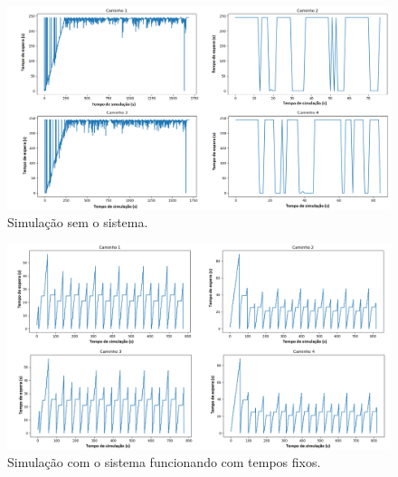 \begin{figure}[H]
    \begin{center}
    \includegraphics[width=1.0\textwidth]{figuras/Queue_Duration_No_TrafficLight.PNG}
    \end{center}
    \caption[Duração das filas, cenário 1]{Simulação sem o sistema.}
    \label{queueNoTL}
\end{figure}

\begin{figure}[H]
    \begin{center}
    \includegraphics[width=1.0\textwidth]{figuras/Queue_Duration_With_TrafficLight.PNG}
    \end{center}
    \caption[Duração das filas, cenário 2]{Simulação com o sistema funcionando com tempos fixos.}
    \label{queueWithTL}
\end{figure}

